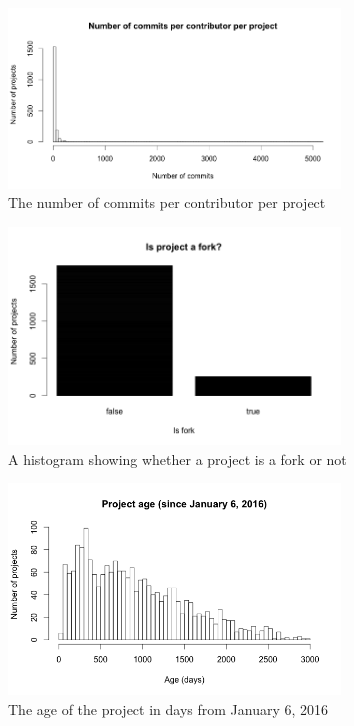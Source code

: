 

	    \begin{figure}[h!]
	        \includegraphics[width=250pt]{figures/nr-commits-per-contributor}
	        \caption{The number of commits per contributor per project}
	        \label{fig:nr-commit-contributor-plot}
	    \end{figure}

	    \begin{figure}[h!]
	        \includegraphics[width=250pt]{figures/isfork-per-project}
	        \caption{A histogram showing whether a project is a fork or not}
	        \label{fig:is-fork-plot}
	    \end{figure}

	    \begin{figure}[h!]
	        \includegraphics[width=250pt]{figures/project-age}
	        \caption{The age of the project in days from January 6, 2016}
	        \label{fig:age-plot}
	    \end{figure}


